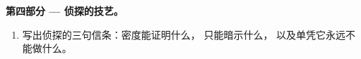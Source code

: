 \begin{problem}
\medskip\noindent\textbf{第四部分 --- 侦探的技艺。}
\begin{enumerate}[resume]
  \item 写出侦探的三句信条：密度能证明什么，
        只能暗示什么，
        以及单凭它永远不能做什么。
\end{enumerate}
\end{problem}
